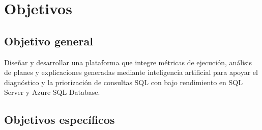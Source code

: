 \documentclass[12pt,a4paper]{article}
\begin{document}
\section{Objetivos}

\subsection{Objetivo general}

Diseñar y desarrollar una plataforma que integre métricas de ejecución, análisis de planes y explicaciones generadas mediante inteligencia artificial para apoyar el diagnóstico y la priorización de consultas SQL con bajo rendimiento en SQL Server y Azure SQL Database.

\subsection{Objetivos específicos}
\end{document}
